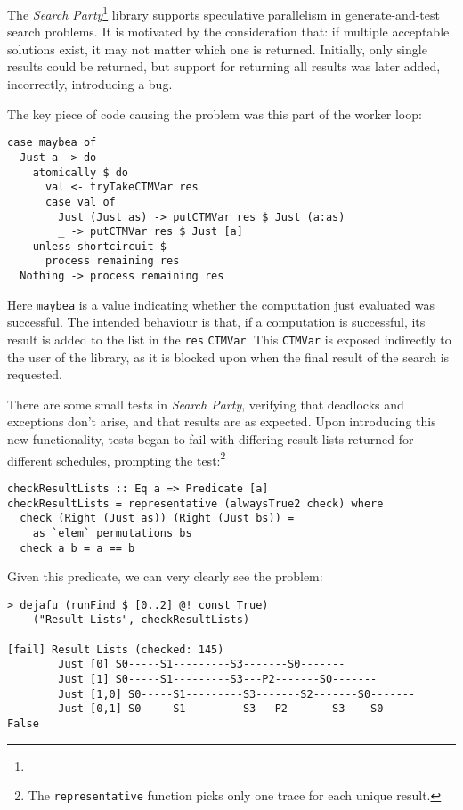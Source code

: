 The \emph{Search Party}\footnote{}
library supports speculative parallelism in generate-and-test search
problems. It is motivated by the consideration that: if multiple
acceptable solutions exist, it may not matter which one is
returned. Initially, only single results could be returned, but
support for returning all results was later added, incorrectly,
introducing a bug.

The key piece of code causing the problem was this part of the worker
loop:

\begin{verbatim}
case maybea of
  Just a -> do
    atomically $ do
      val <- tryTakeCTMVar res
      case val of
        Just (Just as) -> putCTMVar res $ Just (a:as)
        _ -> putCTMVar res $ Just [a]
    unless shortcircuit $
      process remaining res
  Nothing -> process remaining res
\end{verbatim}

Here \verb|maybea| is a value indicating whether the computation just
evaluated was successful. The intended behaviour is that, if a
computation is successful, its result is added to the list in the
\verb|res| \verb|CTMVar|. This \verb|CTMVar| is exposed indirectly to
the user of the library, as it is blocked upon when the final result
of the search is requested.

There are some small tests in \emph{Search Party}, verifying that
deadlocks and exceptions don't arise, and that results are as
expected. Upon introducing this new functionality, tests began to fail
with differing result lists returned for different schedules,
prompting the test:\footnote{The \texttt{representative} function
  picks only one trace for each unique result.}

\begin{verbatim}
checkResultLists :: Eq a => Predicate [a]
checkResultLists = representative (alwaysTrue2 check) where
  check (Right (Just as)) (Right (Just bs)) =
    as `elem` permutations bs
  check a b = a == b
\end{verbatim}

Given this predicate, we can very clearly see the problem:

\begin{verbatim}
> dejafu (runFind $ [0..2] @! const True)
    ("Result Lists", checkResultLists)

[fail] Result Lists (checked: 145)
        Just [0] S0-----S1---------S3-------S0-------
        Just [1] S0-----S1---------S3---P2-------S0-------
        Just [1,0] S0-----S1---------S3-------S2-------S0-------
        Just [0,1] S0-----S1---------S3---P2-------S3----S0-------
False
\end{verbatim}

